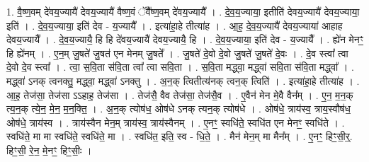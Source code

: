 \documentclass[17pt]{extarticle}
\begin{document}
1. वै॒ष्ण॒वम् दे॑वय॒ज्यायै॑ देवय॒ज्यायै॑ वैष्ण॒वं ॅवै᳚ष्ण॒वम् दे॑वय॒ज्यायै᳚ । . दे॒व॒य॒ज्याया॒ इतीति॑ देवय॒ज्यायै॑ देवय॒ज्याया॒ इति॑ । . दे॒व॒य॒ज्याया॒ इति॑ देव - य॒ज्यायै᳚ । . इत्या॑हा॒हे तीत्या॑ह । . आ॒ह॒ दे॒व॒य॒ज्यायै॑ देवय॒ज्याया॑ आहाह देवय॒ज्यायै᳚ । . दे॒व॒य॒ज्यायै॒ हि हि दे॑वय॒ज्यायै॑ देवय॒ज्यायै॒ हि । . दे॒व॒य॒ज्याया॒ इति॑ देव - य॒ज्यायै᳚ । . ह्ये॑न मेनꣳ॒॒ हि ह्ये॑नम् । . ए॒न॒म् जु॒षते॑ जु॒षत॑ एन मेनम् जु॒षते᳚ । . जु॒षते॑ दे॒वो दे॒वो जु॒षते॑ जु॒षते॑ दे॒वः । . दे॒व स्त्वा᳚ त्वा दे॒वो दे॒व स्त्वा᳚ । . त्वा॒ स॒वि॒ता स॑वि॒ता त्वा᳚ त्वा सवि॒ता । . स॒वि॒ता मद्ध्वा॒ मद्ध्वा॑ सवि॒ता स॑वि॒ता मद्ध्वा᳚ । . मद्ध्वा॑ ऽनक् त्वनक्तु॒ मद्ध्वा॒ मद्ध्वा॑ ऽनक्तु । . अ॒न॒क् त्वितीत्य॑नक् त्वन॒क् त्विति॑ । . इत्या॑हा॒हे तीत्या॑ह । . आ॒ह॒ तेज॑सा॒ तेज॑सा ऽऽहाह॒ तेज॑सा । . तेज॑सै॒ वैव तेज॑सा॒ तेज॑सै॒व । . ए॒वैन॑ मेन मे॒वै वैन᳚म् । . ए॒न॒ म॒न॒क् त्य॒न॒क् त्ये॒न॒ मे॒न॒ म॒न॒क्ति॒ । . अ॒न॒क् त्योष॑ध॒ ओष॑धे ऽनक् त्यन॒क् त्योष॑धे । . ओष॑धे॒ त्राय॑स्व॒ त्राय॒स्वौष॑ध॒ ओष॑धे॒ त्राय॑स्व । . त्राय॑स्वैन मेन॒म् त्राय॑स्व॒ त्राय॑स्वैनम् । . ए॒नꣳ॒॒ स्वधि॑ते॒ स्वधि॑त एन मेनꣳ॒॒ स्वधि॑ते । . स्वधि॑ते॒ मा मा स्वधि॑ते॒ स्वधि॑ते॒ मा । . स्वधि॑त॒ इति॒ स्व - धि॒ते॒ । . मैन॑ मेन॒म् मा मैन᳚म् । . ए॒नꣳ॒॒ हिꣳ॒॒सी॒र्॒. हिꣳ॒॒सी॒ रे॒न॒ मे॒नꣳ॒॒ हिꣳ॒॒सीः॒ । \newline
\end{document}
